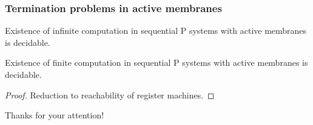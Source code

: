     \begin{frame}[t]\frametitle{Termination problems in active membranes}
      \begin{theorem}
        Existence of infinite computation in sequential P systems with active membranes is decidable.
      \end{theorem}
      \pause

      \begin{theorem}
        Existence of finite computation in sequential P systems with active membranes is decidable.
      \end{theorem}
      \pause

      \begin{proof}
        Reduction to reachability of register machines.
      \end{proof}
    \end{frame}



\begin{frame}[plain]
  
\end{frame}


\begin{frame}[plain]
  \begin{center}
    Thanks for your attention!
  \end{center}
\end{frame}


